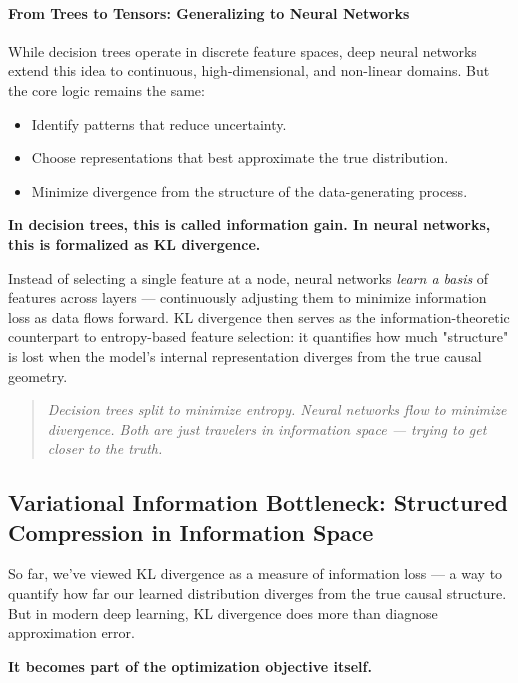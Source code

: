\paragraph{From Trees to Tensors: Generalizing to Neural Networks}

While decision trees operate in discrete feature spaces, deep neural networks extend this idea to continuous, high-dimensional, and non-linear domains. But the core logic remains the same:

\begin{itemize}
    \item Identify patterns that reduce uncertainty.
    \item Choose representations that best approximate the true distribution.
    \item Minimize divergence from the structure of the data-generating process.
\end{itemize}

\textbf{In decision trees, this is called information gain. In neural networks, this is formalized as KL divergence.}

Instead of selecting a single feature at a node, neural networks \textit{learn a basis} of features across layers — continuously adjusting them to minimize information loss as data flows forward. KL divergence then serves as the information-theoretic counterpart to entropy-based feature selection: it quantifies how much "structure" is lost when the model’s internal representation diverges from the true causal geometry.

\vspace{1em}
\begin{quote}
\textit{Decision trees split to minimize entropy. Neural networks flow to minimize divergence. Both are just travelers in information space — trying to get closer to the truth.}
\end{quote}


\subsection{Variational Information Bottleneck: Structured Compression in Information Space}

So far, we’ve viewed KL divergence as a measure of information loss — a way to quantify how far our learned distribution diverges from the true causal structure. But in modern deep learning, KL divergence does more than diagnose approximation error.

\textbf{It becomes part of the optimization objective itself.}

